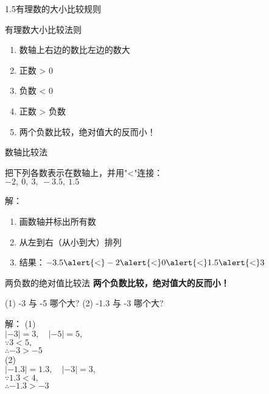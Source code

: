 \documentclass[aspectratio=169]{ctexbeamer} %
\date{\today}
\begin{document}
\begin{frame}{1.5有理数的大小比较规则}
\begin{block}{有理数大小比较法则}
\begin{enumerate}[label={\arabic*.}]
  \item 数轴上右边的数比左边的数\alert{大}
  \item 正数 \alert{>} 0
  \item 负数 \alert{<} 0
  \item 正数 \alert{>} 负数
  \item 两个负数比较，绝对值大的反而\alert{小}！
\end{enumerate}
\end{block}

\end{frame}

\begin{frame}{数轴比较法}
\begin{example}
  把下列各数表示在数轴上，并用"<"连接：\\
  $-2,\ 0,\ 3,\ -3.5,\ 1.5$
\end{example}

\pause
\begin{block}{解：}
\begin{enumerate}[label={\arabic*.}]
  \item 画数轴并标出所有数
  \begin{figure}
  \end{figure}
  \item 从左到右（从小到大）排列
  \item 结果：$-3.5 \alert{<} -2 \alert{<}  0 \alert{<}  1.5 \alert{<}  3$
\end{enumerate}
\end{block}
\end{frame}

\begin{frame}{两负数的绝对值比较法}
\textbf{两个负数比较，绝对值大的反而\alert{小}！}
\begin{example}
(1) -3 与 -5 哪个大? (2) -1.3 与 -3 哪个大?\\
\end{example}
\pause
\begin{block}{解：}
(1) \\
$| -3 | = 3, \quad | -5 | = 5, $ \\
$\because 3 < 5, $ \\
$\therefore -3 > -5$ \\
(2) \\
$| -1.3 | = 1.3, \quad |-3| = 3, $ \\
$\because 1.3 < 4, $\\
$\therefore -1.3 > -3$
\end{block}
\end{frame}
\end{document}
